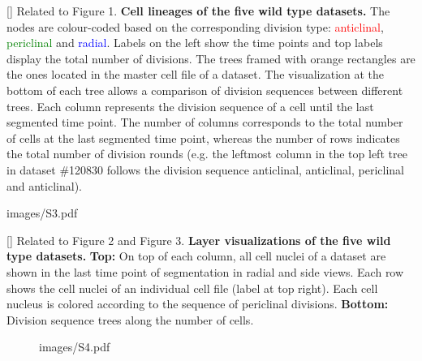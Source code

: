 []{
Related to Figure 1.
{\bf Cell lineages of the five wild type datasets.} The nodes are colour-coded based on the corresponding division type: \textcolor{red}{anticlinal}, \textcolor{green}{periclinal} and \textcolor{blue}{radial}. Labels on the left show the time points and top labels display the total number of divisions. The trees framed with orange rectangles are the ones located in the master cell file of a dataset. The visualization at the bottom of each tree allows a comparison of division sequences between different trees. Each column represents the division sequence of a cell until the last segmented time point. The number of columns corresponds to the total number of cells at the last segmented time point, whereas the number of rows indicates the total number of division rounds (e.g. the leftmost column in the top left tree in dataset \#120830 follows the division sequence anticlinal, anticlinal, periclinal and anticlinal).
}
\label{fig:S2}
%
\clearpage
%
\begin{sidewaysfigure}
\centering
	\begin{overpic}[width=1.\linewidth]{images/S3.pdf}
	\end{overpic}
\end{sidewaysfigure}
\clearpage
{}[]{
Related to Figure 2 and Figure 3.
{\bf Layer visualizations of the five wild type datasets.} {\bf Top:} On top of each column, all cell nuclei of a dataset are shown in the last time point of segmentation in radial and side views. Each row shows the cell nuclei of an individual cell file (label at top right). Each cell nucleus is colored according to the sequence of periclinal divisions. {\bf Bottom:} Division sequence trees along the number of cells.
}
\label{fig:S3}
%
\clearpage
%
\begin{figure}[htbp]
\centering
	\begin{overpic}[width=1.\linewidth]{images/S4.pdf}
	\end{overpic}
\end{figure}
\clearpage
